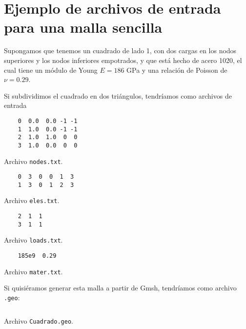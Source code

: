 \section{Ejemplo de archivos de entrada para una malla sencilla}
Supongamos que tenemos un cuadrado de lado 1, con dos cargas en los nodos superiores y los nodos inferiores empotrados, y que está hecho de acero 1020, el cual tiene un módulo de Young $E = 186$ GPa y una relación de Poisson de $\nu = 0.29$.

Si subdividimos el cuadrado en dos triángulos, tendríamos como archivos de entrada
\begin{listing}[H]
    \begin{verbatim}
    0  0.0  0.0 -1 -1
    1  1.0  0.0 -1 -1
    2  1.0  1.0  0  0
    3  1.0  0.0  0  0
    \end{verbatim}
    \caption{Archivo \texttt{nodes.txt}.}
    \label{lst:nodes}
\end{listing}


\begin{listing}[H]
    \begin{verbatim}
    0  3  0  0  1  3 
    1  3  0  1  2  3
    \end{verbatim}
    \caption{Archivo \texttt{eles.txt}.}
    \label{lst:elements}
\end{listing}

\begin{listing}[H]
    \begin{verbatim}
    2  1  1
    3  1  1
    \end{verbatim}
    \caption{Archivo \texttt{loads.txt}.}
    \label{lst:loads}
\end{listing}

\begin{listing}[H]
    \begin{verbatim}
    185e9  0.29
    \end{verbatim}
    \caption{Archivo \texttt{mater.txt}.}
    \label{lst:mater}
\end{listing}

Si quisiéramos generar esta malla a partir de Gmsh, tendríamos como archivo \texttt{.geo}:
\begin{listing}[H]
	\inputminted[mathescape,
               linenos,
               numbersep=5pt,
               gobble=0,
               frame=lines,
               framesep=2mm]{c}{src/tutorial/Cuadrado.geo}
    \caption{Archivo \texttt{Cuadrado.geo}.}
    \label{lst:mater}
\end{listing}
